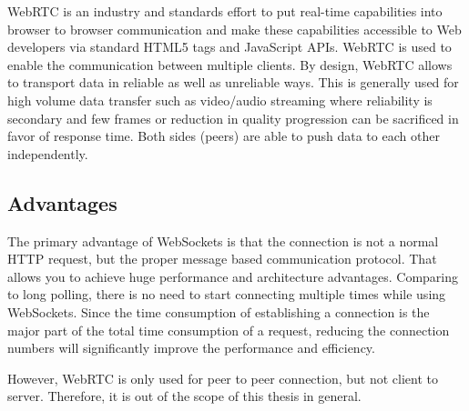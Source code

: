WebRTC is an industry and standards effort to put real-time capabilities into browser to browser communication and make these capabilities accessible to Web developers via standard HTML5 tags and JavaScript APIs\cite{johnston2012webrtc}. 
WebRTC is used to enable the communication between multiple clients. By design, WebRTC allows to transport data in reliable as well as unreliable ways. This is generally used for high volume data transfer such as video/audio streaming where reliability is secondary and few frames or reduction in quality progression can be sacrificed in favor of response time. Both sides (peers) are able to push data to each other independently.

\subsection{Advantages}

The primary advantage of WebSockets is that the connection is not a normal HTTP request, but the proper message based communication protocol. That allows you to achieve huge performance and architecture advantages. Comparing to long polling, there is no need to start connecting multiple times while using WebSockets. Since the time consumption of establishing a connection is the major part of the total time consumption of a request, reducing the connection numbers will significantly improve the performance and efficiency. 

However, WebRTC is only used for peer to peer connection, but not client to server. Therefore, it is out of the scope of this thesis in general.